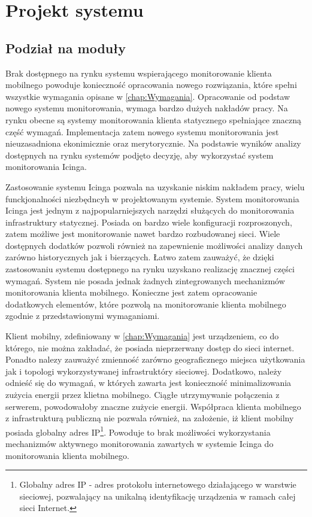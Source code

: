 \chapter{Projekt systemu}
\label{chap:ProjektSystemu}

\section[Podział na moduły][Podział na moduły]{Podział na moduły}

Brak dostępnego na rynku systemu wspierającego monitorowanie klienta
mobilnego powoduje konieczność opracowania nowego rozwiązania, które
spełni wszystkie wymagania opisane w \ref{chap:Wymagania}. Opracowanie
od podstaw nowego systemu monitorowania, wymaga bardzo dużych nakładów
pracy. Na rynku obecne są systemy monitorowania klienta statycznego
spełniające znaczną część wymagań. Implementacja zatem nowego systemu
monitorowania jest nieuzasadniona ekonimicznie oraz merytorycznie. Na
podstawie wyników analizy dostępnych na rynku systemów podjęto
decyzję, aby wykorzystać system monitorowania Icinga.

Zastosowanie systemu Icinga pozwala na uzyskanie niskim nakładem
pracy, wielu funckjonalności niezbędncyh w projektowanym
systemie. System monitorowania Icinga jest jednym z
najpopularniejszych narzędzi służących do monitorowania infrastruktury
statycznej. Posiada on bardzo wiele konfiguracji rozproszonych, zatem
możliwe jest monitorowanie nawet bardzo rozbudowanej sieci. Wiele
dostępnych dodatków pozwoli również na zapewnienie możliwości analizy
danych zarówno historycznych jak i bierzących. Łatwo zatem zauważyć,
że dzięki zastosowaniu systemu dostępnego na rynku uzyskano realizację
znacznej części wymagań. System nie posada jednak żadnych
zintegrowanych mechanizmów monitorowania klienta mobilnego. Konieczne
jest zatem opracowanie dodatkowych elementów, które pozwolą na
monitorowanie klienta mobilnego zgodnie z przedstawionymi wymaganiami.

Klient mobilny, zdefiniowany w \ref{chap:Wymagania} jest urządzeniem,
co do którego, nie można zakładać, że posiada nieprzerwany dostęp
do sieci internet. Ponadto nalezy zauważyć zmienność zarówno
geograficznego miejsca użytkowania jak i topologi wykorzystywanej
infrastruktóry sieciowej. Dodatkowo, należy odnieść się do wymagań, w
których zawarta jest konieczność minimalizowania zużycia energii przez
klietna mobilnego. Ciągłe utrzymywanie połączenia z serwerem,
powodowałoby znaczne zużycie energii. Współpraca klienta mobilnego z
infrastrukturą publiczną nie pozwala również, na założenie, iż klient
mobilny posiada globalny adres IP\footnote{Globalny adres IP - adres
  protokołu internetowego działającego w warstwie sieciowej,
  pozwalający na unikalną identyfikację urządzenia w ramach całej
  sieci Internet.}. Powoduje to brak możliwości wykorzystania
mechanizmów aktywnego monitorowania zawartych w systemie Icinga do
monitorowania klienta mobilnego.

